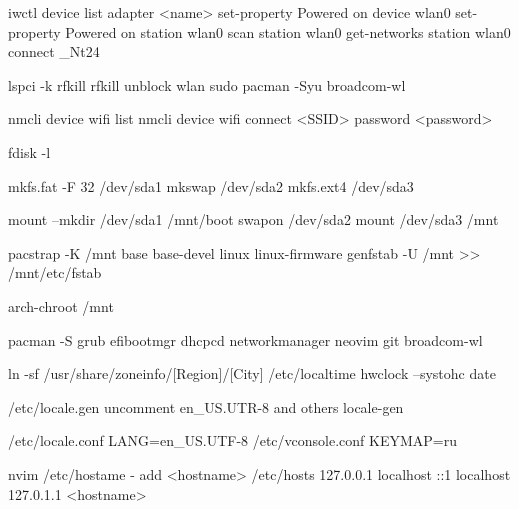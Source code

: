 iwctl
device list
adapter <name> set-property Powered on
device wlan0 set-property Powered on
station wlan0 scan
station wlan0 get-networks
station wlan0 connect _Nt24

lspci -k
rfkill
rfkill unblock wlan
sudo pacman -Syu broadcom-wl

nmcli device wifi list
nmcli device wifi connect <SSID> password <password>

fdisk -l

mkfs.fat -F 32 /dev/sda1
mkswap /dev/sda2
mkfs.ext4 /dev/sda3

mount --mkdir /dev/sda1 /mnt/boot
swapon /dev/sda2
mount /dev/sda3 /mnt

pacstrap -K /mnt base base-devel linux linux-firmware
genfstab -U /mnt >> /mnt/etc/fstab


arch-chroot /mnt

pacman -S 
    grub
    efibootmgr
    dhcpcd
    networkmanager
    neovim
    git
    broadcom-wl %


ln -sf /usr/share/zoneinfo/[Region]/[City] /etc/localtime
hwclock --systohc
date


/etc/locale.gen uncomment en_US.UTR-8 and others
locale-gen

/etc/locale.conf
LANG=en_US.UTF-8
/etc/vconsole.conf
KEYMAP=ru


nvim /etc/hostame - add <hostname>
/etc/hosts
127.0.0.1 localhost
::1       localhost
127.0.1.1 <hostname>


